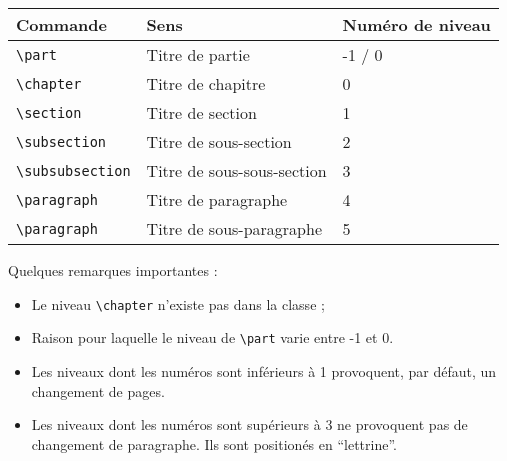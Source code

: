  	\begin{tabular}{|l||l|l|}
	\hline 	
 	Commande 				& Sens 						& Numéro de niveau 	\\
 	\hline
 	\hline
 	\verb|\part| 			& Titre de partie 			& -1 / 0	 \\
 	\verb|\chapter| 		& Titre de chapitre 		& 0 	 	 \\
	\verb|\section|			& Titre de section  		& 1			\\
	\verb|\subsection|		& Titre de sous-section 	& 2			\\
	\verb|\subsubsection|	& Titre de sous-sous-section& 3			\\
	\verb|\paragraph|		& Titre de paragraphe 		&4			\\
	\verb|\paragraph|		& Titre de sous-paragraphe 	&5			\\
	\hline
	\end{tabular}


Quelques remarques importantes :
\begin{itemize}
\item Le niveau \verb|\chapter| n'existe pas dans la classe ;
\item Raison pour laquelle le niveau de \verb|\part| varie entre -1 et 0.
\item Les niveaux dont les numéros sont inférieurs à 1 provoquent, par défaut, un changement de pages.
\item Les niveaux dont les numéros sont supérieurs à 3 ne provoquent pas de changement de paragraphe. Ils sont positionés en \enquote{lettrine}.
\end{itemize}


